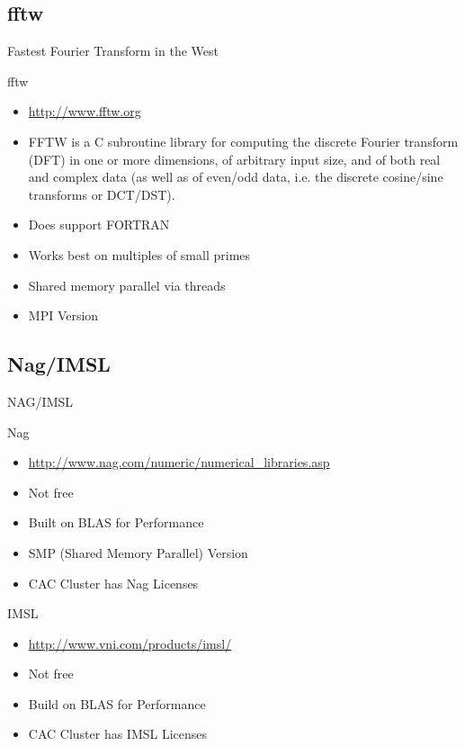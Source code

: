 \documentclass[handout]{beamer}
\begin{document}
\subsection{fftw}
\begin{frame}{Fastest Fourier Transform in the West}
 \begin{block}{fftw}
  \begin{itemize}
   \item \url{http://www.fftw.org}
   \item FFTW is a C subroutine library for computing the discrete Fourier transform (DFT) in one or more dimensions, of arbitrary input size, and of both real and complex data (as well as of even/odd data, i.e. the discrete cosine/sine transforms or DCT/DST). 
   \item Does support FORTRAN
   \item Works best on multiples of small primes
   \item Shared memory parallel via threads
   \item MPI Version
  \end{itemize}
 \end{block}
\end{frame}

\subsection{Nag/IMSL}
\begin{frame}{NAG/IMSL}
 \begin{block}{Nag}
  \begin{itemize}
   \item \url{http://www.nag.com/numeric/numerical\_libraries.asp}
   \item Not free
   \item Built on BLAS for Performance
   \item SMP (Shared Memory Parallel) Version
   \item CAC Cluster has Nag Licenses
  \end{itemize}
 \end{block}
 \begin{block}{IMSL}
  \begin{itemize}
   \item \url{http://www.vni.com/products/imsl/}
   \item Not free
   \item Build on BLAS for Performance
   \item CAC Cluster has IMSL Licenses
  \end{itemize}
 \end{block}
\end{frame}
\end{document}
